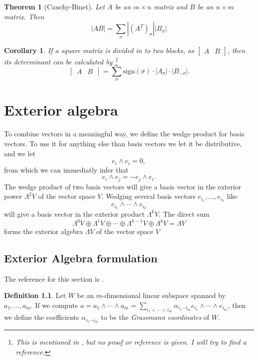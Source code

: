 \documentclass[a4paper,12pt]{book}
\theoremstyle{plain}
\newtheorem{thm}[equation]{Theorem}
\newtheorem{Corollary}[equation]{Corollary}
\theoremstyle{definition}
\newtheorem{defi}[equation]{Definition}
\begin{document}
\begin{thm}[Cauchy-Binet]
	Let \( A \) be an \( m \times n \) matrix and \( B \) be an \( n \times m \) matrix.
	Then
	\[
		|AB| = \sum_\sigma |(A^T)_\sigma| |B_\sigma|
	\]
\end{thm}


\begin{Corollary}
If a square matrix is divided in to two blocks, as
\( \begin{bmatrix}
	A & B
\end{bmatrix} \), then its determinant can be calculated by
\footnote{This is mentioned in \cite{rih_fs_2004}, but
no proof or reference is given. I will try to find a reference.}
\begin{equation}
	\label{eq:detformula}
	\begin{vmatrix}
		A & B
	\end{vmatrix} = \sum_\sigma \text{sign}(\sigma) \cdot
	|A_\sigma| \cdot |B_{-\sigma}|.	
\end{equation}
\end{Corollary}


\chapter{Exterior algebra}

To combine vectors in a meaningful way, we define the wedge product for basis vectors.
To use it for anything else than basis vectors we let it be distributive, and we let
\[
	e_i \wedge e_i = 0,
\]
from which we can immediatly infer that
\[
	e_i \wedge e_j = - e_j \wedge e_i.
\]
The wedge product of two basis vectors will give a basis vector in the exterior power
\( \Lambda^2 V \)
of the vector space \( V \).
Wedging several basis vectors \( e_{i_1}, \ldots, e_{i_k} \) like
\[
	e_{i_1} \wedge \cdots \wedge e_{i_k}
\]
will give a basis vector in the
exterior product \( \Lambda^k V \).
The direct sum
\[
	\Lambda^0 V \oplus \Lambda^1 V \oplus \cdots \oplus \Lambda^{k-1} V \oplus \Lambda^k V = \Lambda V
\]
forms the exterior algebra \( \Lambda V \) of the vector space \( V \)

\section{Exterior Algebra formulation} %
\label{sec:exterior_algebra_formulation}
The reference for this section is \cite{MR1849803}.
\begin{defi}
	Let \( W \) be an \( m \)-dimensional linear subspace spanned by \( a_1, \ldots, a_m \).
	If we compute \( a = a_1 \wedge \cdots \wedge a_m =
	\sum_{i_1 < \cdots < i_m} \alpha_{i_1 \cdots i_m} e_{i_1} \wedge \cdots \wedge e_{i_m} \), then
	we define the coefficients \( \alpha_{i_1 \cdots i_m} \) to be the \emph{Grassmann coordinates}
	of \( W \).
\end{defi}
\end{document}

